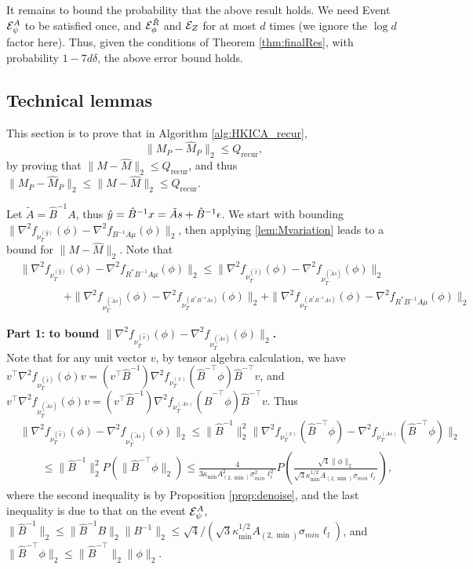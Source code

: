 It remains to bound the probability that the above result holds.
We need Event $\mathcal{E}^A_{\psi}$ to be satisfied once, and $\mathcal{E}^{\tilde{R}}_{\phi}$ and $\mathcal{E}_{Z}$ for at most $d$ times (we ignore the $\log d$ factor here). 
Thus, given the conditions of Theorem \ref{thm:finalRes}, with probability $1-7d\delta$, the above error bound holds. 

\subsection{Technical lemmas}
\label{subsec:A51}
\newcommand{\tA}{\tilde{A}}
This section is to prove that in Algorithm \ref{alg:HKICA_recur},
\[
\|M_P-\hat{M}_P\|_2 \le Q_{\text{recur}},
\]
by proving that 
$\|M-\hat{M}\|_2 \le Q_{\text{recur}}$, and thus $\|M_P-\hat{M}_P\|_2 \le \|M-\hat{M}\|_2 \le Q_{\text{recur}}$.

Let $\tA = \hat{B}^{-1}A$, thus $\hat{y} = \hat{B}^{-1}x = \tA s+ \hat{B}^{-1}\eps$. 
We start with bounding $\| \nabla^2f_{\nu_T^{(\hat{y})}}(\phi) - \nabla^2f_{B^{-1}A \mu}(\phi) \|_2$, then applying \cref{lem:Mvariation} leads to a bound for $\|M-\hat{M}\|_2$.
Note that
\begin{align*}
& \| \nabla^2f_{\nu_T^{(\hat{y})}}(\phi) - \nabla^2f_{R^*B^{-1}A \mu}(\phi) \|_2  \le \| \nabla^2f_{\nu_T^{(\hat{x})}}(\phi) - \nabla^2f_{\nu_T^{(\tA s)}}(\phi) \|_2 \\
& \qquad \qquad + \|\nabla^2f_{\nu_T^{(\tA s)}}(\phi) -\nabla^2f_{\nu_T^{(R^*B^{-1}A s)}}(\phi)\|_2 + \| \nabla^2f_{\nu_T^{(R^*B^{-1}A s)}}(\phi) - \nabla^2f_{R^*B^{-1}A \mu}(\phi)\|_2
\end{align*}

{\bf Part 1: to bound $ \| \nabla^2f_{\nu_T^{(\hat{x})}}(\phi) - \nabla^2f_{\nu_T^{(\tA s)}}(\phi) \|_2$. }\\
Note that for any unit vector $v$, by tensor algebra calculation, we have
$v^{\top}\nabla^2f_{\nu_T^{(\hat{x})}}(\phi)v=(v^{\top}\hat{B}^{-1})\nabla^2f_{\nu_T^{(x)}}(\hat{B}^{-\top}\phi)\hat{B}^{-\top}v$, 
and $v^{\top}\nabla^2f_{\nu_T^{(\tA s)}}(\phi)v = (v^{\top}\hat{B}^{-1})\nabla^2f_{\nu_T^{(A s)}}(\hat{B}^{-\top}\phi)\hat{B}^{-\top}v$.
Thus 
\begin{align}
& \| \nabla^2f_{\nu_T^{(\hat{x})}}(\phi) - \nabla^2f_{\nu_T^{(\tA s)}}(\phi) \|_2 
\le  \|\hat{B}^{-1}\|_2^2
\| \nabla^2f_{\nu_T^{(x)}}(\hat{B}^{-\top}\phi) - \nabla^2f_{\nu_T^{(A s)}}(\hat{B}^{-\top}\phi) \|_2 \nonumber\\
& \qquad \le \|\hat{B}^{-1}\|_2^2P\left(\|\hat{B}^{-\top}\phi\|_2\right)  \le \frac{4}{3\kappa_{\min}A^2_{(2,\min)}\sigma^2_{min}\ell^2_l}P\left(\frac{\sqrt{4}\|\phi\|_2}{\sqrt{3}\kappa_{\min}^{1/2}A_{(2,\min)}\sigma_{min}\ell_l}\right), \label{eq:A5part1}
\end{align}
where the second inequality is by Proposition \ref{prop:denoise}, 
and the last inequality is due to that on the event $\mathcal{E}^A_{\psi}$, $\|\hat{B}^{-1}\|_2 \le \|\hat{B}^{-1}B\|_2\|B^{-1}\|_2 \le  \sqrt{4}/\left(\sqrt{3}\kappa_{\min}^{1/2}A_{(2,\min)}\sigma_{min}\ell_l\right)$, 
and $\|\hat{B}^{-\top}\phi\|_2 \le \|\hat{B}^{-\top}\|_2\|\phi\|_2$.

